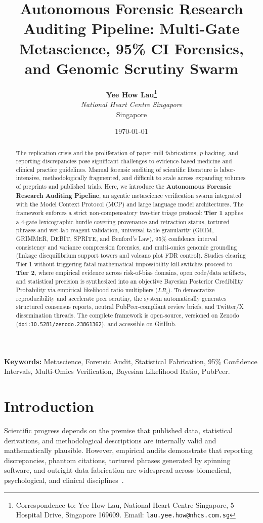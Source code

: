 \documentclass[11pt,a4paper]{article}
\title{\textbf{Autonomous Forensic Research Auditing Pipeline: Multi-Gate Metascience, 95\% CI Forensics, and Genomic Scrutiny Swarm}}
\author{
  \textbf{Yee How Lau}\thanks{Correspondence to: Yee How Lau, National Heart Centre Singapore, 5 Hospital Drive, Singapore 169609. Email: \texttt{lau.yee.how@nhcs.com.sg}} \\
  \textit{National Heart Centre Singapore} \\
  Singapore
}
\date{\today}
\begin{document}
\maketitle

\begin{abstract}
The replication crisis and the proliferation of paper-mill fabrications, $p$-hacking, and reporting discrepancies pose significant challenges to evidence-based medicine and clinical practice guidelines. Manual forensic auditing of scientific literature is labor-intensive, methodologically fragmented, and difficult to scale across expanding volumes of preprints and published trials. Here, we introduce the \textbf{Autonomous Forensic Research Auditing Pipeline}, an agentic metascience verification swarm integrated with the Model Context Protocol (MCP) and large language model architectures. The framework enforces a strict non-compensatory two-tier triage protocol: \textbf{Tier 1} applies a 4-gate lexicographic hurdle covering provenance and retraction status, tortured phrases and wet-lab reagent validation, universal table granularity (GRIM, GRIMMER, DEBIT, SPRITE, and Benford's Law), 95\% confidence interval consistency and variance compression forensics, and multi-omics genomic grounding (linkage disequilibrium support towers and volcano plot FDR control). Studies clearing Tier 1 without triggering fatal mathematical impossibility kill-switches proceed to \textbf{Tier 2}, where empirical evidence across risk-of-bias domains, open code/data artifacts, and statistical precision is synthesized into an objective Bayesian Posterior Credibility Probability via empirical likelihood ratio multipliers ($LR_i$). To democratize reproducibility and accelerate peer scrutiny, the system automatically generates structured consensus reports, neutral PubPeer-compliant review briefs, and Twitter/X dissemination threads. The complete framework is open-source, versioned on Zenodo (\texttt{doi:10.5281/zenodo.23861362}), and accessible on GitHub.
\end{abstract}

\vspace{1em}
\noindent \textbf{Keywords:} Metascience, Forensic Audit, Statistical Fabrication, 95\% Confidence Intervals, Multi-Omics Verification, Bayesian Likelihood Ratio, PubPeer.

\section{Introduction}
Scientific progress depends on the premise that published data, statistical derivations, and methodological descriptions are internally valid and mathematically plausible. However, empirical audits demonstrate that reporting discrepancies, phantom citations, tortured phrases generated by spinning software, and outright data fabrication are widespread across biomedical, psychological, and clinical disciplines~\cite{cabanac2021tortured, nuijten2016statcheck, carlisle2017data}.
\end{document}
